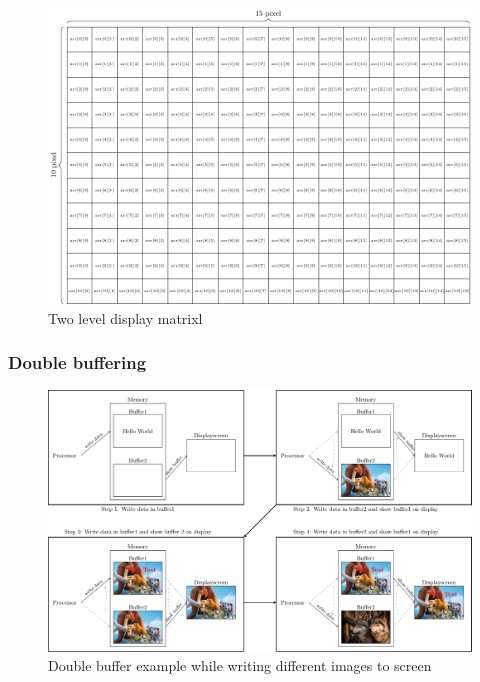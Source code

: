 \begin{figure}[H]
	\centering
	\includegraphics[width=1\textwidth]{2-theory/drawing-graphics/graphics/matrix2.pdf}
	\caption{Two level display matrixl\label{theory:matrix2}}
\end{figure}

\subsubsection{Double buffering}


  

\begin{figure}[H]
	\centering
	\includegraphics[width=1\textwidth]{2-theory/drawing-graphics/graphics/buffer.pdf}
	\caption{Double buffer example while writing different images to screen\label{theory:buffer}}
\end{figure}




